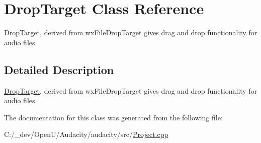 \hypertarget{class_drop_target}{}\section{Drop\+Target Class Reference}
\label{class_drop_target}


\hyperlink{class_drop_target}{Drop\+Target}, derived from wx\+File\+Drop\+Target gives drag and drop functionality for audio files.  




\subsection{Detailed Description}
\hyperlink{class_drop_target}{Drop\+Target}, derived from wx\+File\+Drop\+Target gives drag and drop functionality for audio files. 

The documentation for this class was generated from the following file\+:\begin{DoxyCompactItemize}
\item 
C\+:/\+\_\+dev/\+Open\+U/\+Audacity/audacity/src/\hyperlink{_project_8cpp}{Project.\+cpp}\end{DoxyCompactItemize}
